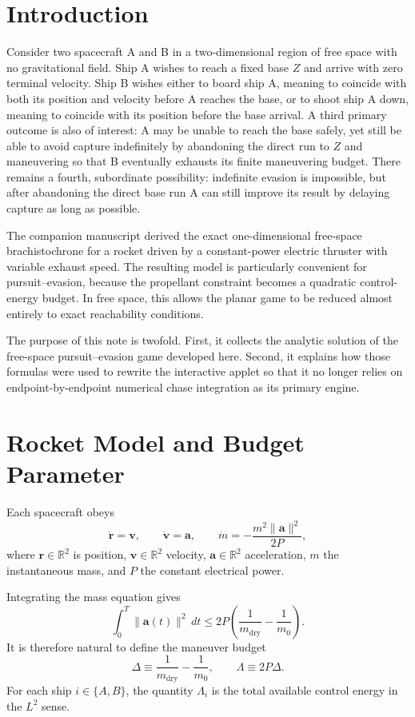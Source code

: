\documentclass[journal, a4paper]{IEEEtran}
\begin{document}
\section{Introduction}
Consider two spacecraft A and B in a two-dimensional region of free space with no gravitational field. Ship A wishes to reach a fixed base $Z$ and arrive with zero terminal velocity. Ship B wishes either to board ship A, meaning to coincide with both its position and velocity before A reaches the base, or to shoot ship A down, meaning to coincide with its position before the base arrival. A third primary outcome is also of interest: A may be unable to reach the base safely, yet still be able to avoid capture indefinitely by abandoning the direct run to $Z$ and maneuvering so that B eventually exhausts its finite maneuvering budget. There remains a fourth, subordinate possibility: indefinite evasion is impossible, but after abandoning the direct base run A can still improve its result by delaying capture as long as possible.

The companion manuscript derived the exact one-dimensional free-space brachistochrone for a rocket driven by a constant-power electric thruster with variable exhaust speed. The resulting model is particularly convenient for pursuit--evasion, because the propellant constraint becomes a quadratic control-energy budget. In free space, this allows the planar game to be reduced almost entirely to exact reachability conditions.

The purpose of this note is twofold. First, it collects the analytic solution of the free-space pursuit--evasion game developed here. Second, it explains how those formulas were used to rewrite the interactive applet so that it no longer relies on endpoint-by-endpoint numerical chase integration as its primary engine. 

\section{Rocket Model and Budget Parameter}
Each spacecraft obeys
\begin{equation}
\dot{\mathbf r}=\mathbf v, \qquad
\dot{\mathbf v}=\mathbf a, \qquad
\dot m = -\frac{m^2\|\mathbf a\|^2}{2P},
\label{eq:dynamics}
\end{equation}
where $\mathbf r\in\mathbb R^2$ is position, $\mathbf v\in\mathbb R^2$ velocity, $\mathbf a\in\mathbb R^2$ acceleration, $m$ the instantaneous mass, and $P$ the constant electrical power.

Integrating the mass equation gives
\begin{equation}
\int_0^T \|\mathbf a(t)\|^2\,dt
\le 2P\left(\frac{1}{m_{\mathrm{dry}}}-\frac{1}{m_0}\right).
\end{equation}
It is therefore natural to define the maneuver budget
\begin{equation}
\Delta \equiv \frac{1}{m_{\mathrm{dry}}}-\frac{1}{m_0},
\qquad
\Lambda \equiv 2P\Delta.
\label{eq:Lambda_def}
\end{equation}
For each ship $i\in\{A,B\}$, the quantity $\Lambda_i$ is the total available control energy in the $L^2$ sense.
\end{document}
